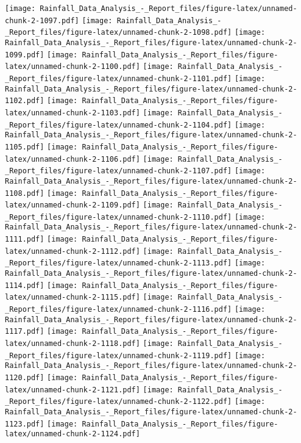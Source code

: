 \documentclass[
]{article}
\begin{document}
\texttt{[image: Rainfall\_Data\_Analysis\_-\_Report\_files/figure-latex/unnamed-chunk-2-1097.pdf]}
\texttt{[image: Rainfall\_Data\_Analysis\_-\_Report\_files/figure-latex/unnamed-chunk-2-1098.pdf]}
\texttt{[image: Rainfall\_Data\_Analysis\_-\_Report\_files/figure-latex/unnamed-chunk-2-1099.pdf]}
\texttt{[image: Rainfall\_Data\_Analysis\_-\_Report\_files/figure-latex/unnamed-chunk-2-1100.pdf]}
\texttt{[image: Rainfall\_Data\_Analysis\_-\_Report\_files/figure-latex/unnamed-chunk-2-1101.pdf]}
\texttt{[image: Rainfall\_Data\_Analysis\_-\_Report\_files/figure-latex/unnamed-chunk-2-1102.pdf]}
\texttt{[image: Rainfall\_Data\_Analysis\_-\_Report\_files/figure-latex/unnamed-chunk-2-1103.pdf]}
\texttt{[image: Rainfall\_Data\_Analysis\_-\_Report\_files/figure-latex/unnamed-chunk-2-1104.pdf]}
\texttt{[image: Rainfall\_Data\_Analysis\_-\_Report\_files/figure-latex/unnamed-chunk-2-1105.pdf]}
\texttt{[image: Rainfall\_Data\_Analysis\_-\_Report\_files/figure-latex/unnamed-chunk-2-1106.pdf]}
\texttt{[image: Rainfall\_Data\_Analysis\_-\_Report\_files/figure-latex/unnamed-chunk-2-1107.pdf]}
\texttt{[image: Rainfall\_Data\_Analysis\_-\_Report\_files/figure-latex/unnamed-chunk-2-1108.pdf]}
\texttt{[image: Rainfall\_Data\_Analysis\_-\_Report\_files/figure-latex/unnamed-chunk-2-1109.pdf]}
\texttt{[image: Rainfall\_Data\_Analysis\_-\_Report\_files/figure-latex/unnamed-chunk-2-1110.pdf]}
\texttt{[image: Rainfall\_Data\_Analysis\_-\_Report\_files/figure-latex/unnamed-chunk-2-1111.pdf]}
\texttt{[image: Rainfall\_Data\_Analysis\_-\_Report\_files/figure-latex/unnamed-chunk-2-1112.pdf]}
\texttt{[image: Rainfall\_Data\_Analysis\_-\_Report\_files/figure-latex/unnamed-chunk-2-1113.pdf]}
\texttt{[image: Rainfall\_Data\_Analysis\_-\_Report\_files/figure-latex/unnamed-chunk-2-1114.pdf]}
\texttt{[image: Rainfall\_Data\_Analysis\_-\_Report\_files/figure-latex/unnamed-chunk-2-1115.pdf]}
\texttt{[image: Rainfall\_Data\_Analysis\_-\_Report\_files/figure-latex/unnamed-chunk-2-1116.pdf]}
\texttt{[image: Rainfall\_Data\_Analysis\_-\_Report\_files/figure-latex/unnamed-chunk-2-1117.pdf]}
\texttt{[image: Rainfall\_Data\_Analysis\_-\_Report\_files/figure-latex/unnamed-chunk-2-1118.pdf]}
\texttt{[image: Rainfall\_Data\_Analysis\_-\_Report\_files/figure-latex/unnamed-chunk-2-1119.pdf]}
\texttt{[image: Rainfall\_Data\_Analysis\_-\_Report\_files/figure-latex/unnamed-chunk-2-1120.pdf]}
\texttt{[image: Rainfall\_Data\_Analysis\_-\_Report\_files/figure-latex/unnamed-chunk-2-1121.pdf]}
\texttt{[image: Rainfall\_Data\_Analysis\_-\_Report\_files/figure-latex/unnamed-chunk-2-1122.pdf]}
\texttt{[image: Rainfall\_Data\_Analysis\_-\_Report\_files/figure-latex/unnamed-chunk-2-1123.pdf]}
\texttt{[image: Rainfall\_Data\_Analysis\_-\_Report\_files/figure-latex/unnamed-chunk-2-1124.pdf]}
\end{document}
